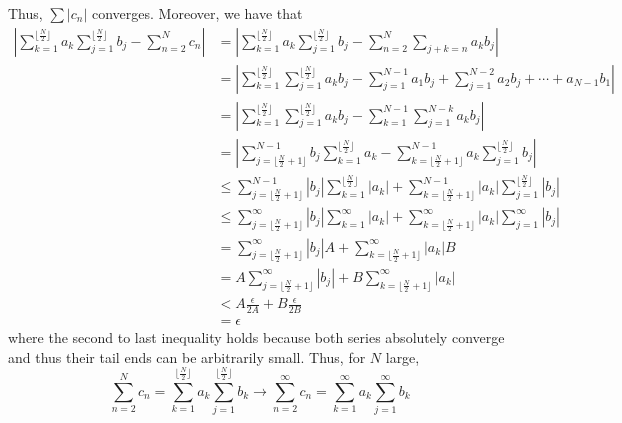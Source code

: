 \documentclass[11pt]{article}
\begin{document}
\begin{solution}
     Thus, $\sum |c_n|$ converges. Moreover, we have that
    \begin{align*}
    \left|\sum_{k=1}^{\lfloor\frac{N}{2}\rfloor}a_k \sum_{j=1}^{\lfloor\frac{N}{2}\rfloor}b_j - \sum_{n=2}^N c_n\right| &= 
    \left|\sum_{k=1}^{\lfloor\frac{N}{2}\rfloor}a_k \sum_{j=1}^{\lfloor\frac{N}{2}\rfloor}b_j - \sum_{n=2}^N \sum_{j + k  = n} a_kb_j\right|\\
    &= \left|\sum_{k=1}^{\lfloor\frac{N}{2}\rfloor} \sum_{j=1}^{\lfloor\frac{N}{2}\rfloor} a_k b_j - \sum_{j=1}^{N-1}a_1b_j + \sum_{j=1}^{N-2}a_2 b_j + \cdots + a_{N-1}b_1\right|\\
    &= \left|\sum_{k=1}^{\lfloor\frac{N}{2}\rfloor} \sum_{j=1}^{\lfloor\frac{N}{2}\rfloor} a_k b_j - \sum_{k=1}^{N-1}\sum_{j=1}^{N-k}a_kb_j\right|\\
    &= \left|\sum_{j= \lfloor\frac{N}{2} + 1\rfloor}^{N-1} b_j\sum_{k=1}^{\lfloor \frac{N}{2}\rfloor}a_k-\sum_{k= \lfloor\frac{N}{2} + 1\rfloor}^{N-1} a_k\sum_{j=1}^{\lfloor \frac{N}{2}\rfloor}b_j\right|\\
    &\leq \sum_{j= \lfloor\frac{N}{2} + 1\rfloor}^{N-1} |b_j|\sum_{k=1}^{\lfloor \frac{N}{2}\rfloor}|a_k| + \sum_{k= \lfloor\frac{N}{2} + 1\rfloor}^{N-1} |a_k|\sum_{j=1}^{\lfloor \frac{N}{2}\rfloor}|b_j|\\
    &\leq \sum_{j= \lfloor\frac{N}{2} + 1\rfloor}^{\infty} |b_j|\sum_{k=1}^{\infty}|a_k| + \sum_{k= \lfloor\frac{N}{2} + 1\rfloor}^{\infty} |a_k|\sum_{j=1}^{\infty}|b_j|\\
    &=\sum_{j= \lfloor\frac{N}{2} + 1\rfloor}^{\infty} |b_j| A + \sum_{k= \lfloor\frac{N}{2} + 1\rfloor}^{\infty} |a_k| B\\
    &= A \sum_{j= \lfloor\frac{N}{2} + 1\rfloor}^{\infty} |b_j|  + B\sum_{k= \lfloor\frac{N}{2} + 1\rfloor}^{\infty} |a_k| \\
    &< A\frac{\epsilon}{2A} + B\frac{\epsilon}{2B}\\
    &= \epsilon
    \end{align*}
where the second to last inequality holds because both series absolutely converge and thus their tail ends can be arbitrarily small. Thus, for $N$ large, 
\[\sum_{n=2}^N c_n = \sum_{k=1}^{\lfloor \frac{N}{2}\rfloor} a_k\sum_{j=1}^{\lfloor \frac{N}{2}\rfloor}b_k \to \sum_{n=2}^\infty c_n = \sum_{k=1}^{\infty} a_k\sum_{j=1}^{\infty}b_k\]
\end{solution}

\newpage
\end{document}
